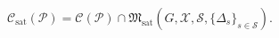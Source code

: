 \[
\mathcal C_{\mathrm{sat}}(\mathcal P)=\mathcal C(\mathcal P)\cap\mathfrak M_{\mathrm{sat}}(G,\mathcal X,\mathcal S,\{\Delta_s\}_{s\in\mathcal S}).
\]